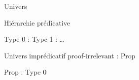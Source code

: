 \documentclass[12pt, aspectratio=169]{beamer}
\begin{document}
        \begin{frame}[fragile]{Univers}
            
            \begin{block}{Hiérarchie prédicative}
        
                Type 0 : Type 1 : \dots

                \begin{center}
                    \begin{prooftree}
                    \end{prooftree}
                \end{center}
                
            \end{block}

            \pause

            \begin{block}{Univers imprédicatif proof-irrelevant : Prop}
                
                Prop : Type 0

                \begin{center}
                    \begin{prooftree}
                    \end{prooftree}
                \end{center}

            \end{block}

        \end{frame}
\end{document}
